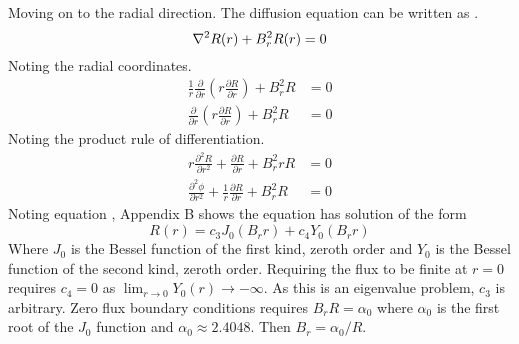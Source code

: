  Moving on to the radial direction. The diffusion equation can be written as
  .
  \begin{equation}
    \mathbf{\nabla}^2 R(r) + B_r^2 R(r) = 0
  \end{equation}
  Noting the radial coordinates.
  \begin{align}
    \frac{1}{r} \frac{\partial}{\partial r} \left( r \frac{\partial R}
      {\partial r} \right) + B_r^2 R &= 0 \\
    \frac{\partial}{\partial r} \left( r \frac{\partial R}{\partial r}
      \right) + B_r^2 R &= 0
  \end{align}
  Noting the product rule of differentiation.
  \begin{align}
    r \frac{\partial^2 R}{\partial r^2} + \frac{\partial R}
      {\partial r} + B_r^2 r R &= 0 \\
    \frac{\partial^2 \phi}{\partial r^2} + \frac{1}{r} \frac{\partial R}
      {\partial r} + B_r^2 R &= 0 \label{eq:besselequation}
  \end{align}
  Noting equation , \cite{textbooklewis} Appendix B
  shows the equation has solution of the form
  \begin{equation} \label{eq:cyl_radial}
    R(r) = c_3 J_0(B_r r) + c_4 Y_0(B_r r)
  \end{equation}
  Where $J_0$ is the Bessel function of the first kind, zeroth order and $Y_0$
  is the Bessel function of the second kind, zeroth order. Requiring the flux
  to be finite at $r=0$ requires $c_4=0$ as 
  $\lim_{r\rightarrow0} Y_0(r) \rightarrow -\infty$. As this is an eigenvalue
  problem, $c_3$ is arbitrary. Zero flux boundary conditions requires 
  $B_r R=\alpha_0$ where $\alpha_0$ is the first root of the $J_0$ function and 
  $\alpha_0 \approx 2.4048$. Then $B_r=\alpha_0/R$.
  
